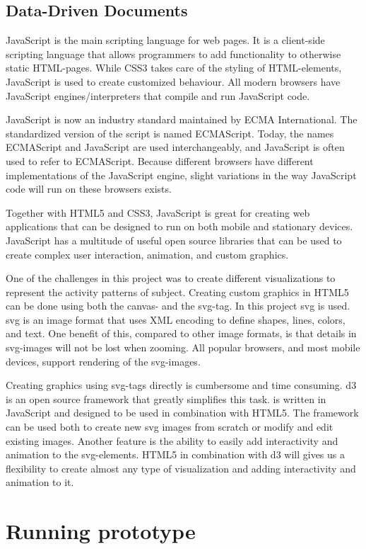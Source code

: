 \subsection{Data-Driven Documents}
JavaScript is the main scripting language for web pages. It is a client-side scripting language that allows programmers to add functionality to otherwise static HTML-pages. While CSS3 takes care of the styling of HTML-elements, JavaScript is used to create customized behaviour. All modern browsers have JavaScript engines/interpreters that compile and run JavaScript code.

JavaScript is now an industry standard maintained by ECMA International. The standardized version of the script is named ECMAScript. Today, the names ECMAScript and JavaScript are used interchangeably, and JavaScript is often used to refer to ECMAScript. Because different browsers have different implementations of the JavaScript engine, slight variations in the way JavaScript code will run on these browsers exists.

Together with HTML5 and CSS3, JavaScript is great for creating web applications that can be designed to run on both mobile and stationary devices. JavaScript has a multitude of useful open source libraries that can be used to create complex user interaction, animation, and custom graphics.

One of the challenges in this project was to create different visualizations to represent the activity patterns of subject. Creating custom graphics in HTML5 can be done using both the canvas- and the svg-tag. In this project \gls{svg} is used. \gls{svg} is an image format that uses XML encoding to define shapes, lines, colors, and text. One benefit of this, compared to other image formats, is that details in \gls{svg}-images will not be lost when zooming. All popular browsers, and most mobile devices, support rendering of the \gls{svg}-images.

Creating graphics using svg-tags directly is cumbersome and time consuming. \gls{d3} is an open source framework that greatly simplifies this task.  is written in JavaScript and designed to be used in combination with HTML5. The framework can be used both to create new \gls{svg} images from scratch or modify and edit existing images. Another feature is the ability to easily add interactivity and animation to the \gls{svg}-elements. HTML5 in combination with \gls{d3} will gives us a flexibility to create almost any type of visualization and adding interactivity and animation to it.

\section{Running prototype}
